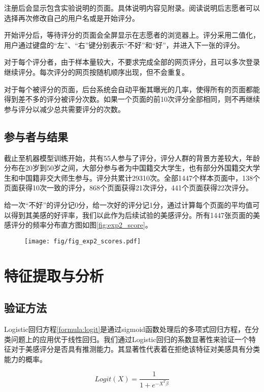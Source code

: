 注册后会显示包含实验说明的页面。具体说明内容见附录。阅读说明后志愿者可以选择再次修改自己的用户名或是开始评分。

开始评分后，等待评分的页面会全屏显示在志愿者的浏览器上。评分采用二值化，用户通过键盘的“左”、“右”键分别表示“不好”和“好”，并进入下一张的评分。

对于每个评分者，由于样本量较大，不要求完成全部的网页评分，且可以多次登录继续评分。每次评分的网页按随机顺序出现，但不会重复。

对于每个被评分的页面，后台系统会自动平衡其曝光的几率，使得所有的页面都能得到差不多的评分被评分次数。如果一个页面的前10次评分全部相同，则不再继续参与评分以减少总共需要评分的次数。

\subsection{参与者与结果}
截止至机器模型训练开始，共有55人参与了评分，评分人群的背景方差较大，年龄分布在20岁到50岁之间，大部分参与者为中国籍交大学生，也有部分外国籍交大学生和中国籍非交大师生参与。评分共累计29310次。全部1447个样本页面中，138个页面获得10次一致的评分，868个页面获得21次评分，441个页面获得22次评分。

给一次“不好”的评分记0分，给一次好的评分记1分，通过计算每个页面的平均值可以得到其美感的好评率，我们以此作为后续试验的美感评分。所有1447张页面的美感评分的频率分布直方图如图\ref{fig:exp2_score}。

\begin{figure}[H]
  \texttt{[image: fig/fig\_exp2\_scores.pdf]}
\end{figure}

\section{特征提取与分析}
\subsection{验证方法}
Logistic回归方程\ref{formula:logit}是通过sigmoid函数处理后的多项式回归方程，在分类问题上的应用优于线性回归。我们通过Logistic回归的系数显著性来验证一个特征对于美感评分是否具有推测能力。其显著性代表着在拒绝该特征对美感具有分类能力的概率。

\begin{equation}
  Logit(X) = \frac{1}{1 + e^{-X^{T}\beta}}
  \label{formula:logit}
\end{equation}

